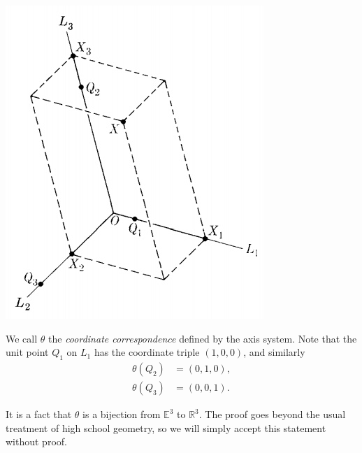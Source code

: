 \documentclass[12pt,letterpaper,reqno]{article}
\numberwithin{equation}{section}
\newcommand{\ti}[1]{\textit{#1}}
\begin{document}
\begin{center}
	\includegraphics[scale=0.5]{figures_mvc/e3_r3}
\end{center}
We call $\theta$ the \ti{coordinate correspondence} defined by the axis system. Note that the unit point $Q_1$ on $L_1$ has the coordinate triple $(1,0,0)$, and similarly
\begin{align*}
	\theta(Q_2)&=(0,1,0), \\
	\theta(Q_3)&=(0,0,1).
\end{align*}

It is a fact that $\theta$ is a bijection from $\mathbb{E}^3$ to $\mathbb{R}^3$. The proof goes beyond the usual treatment of high school geometry, so we will simply accept this statement without proof.
\end{document}
